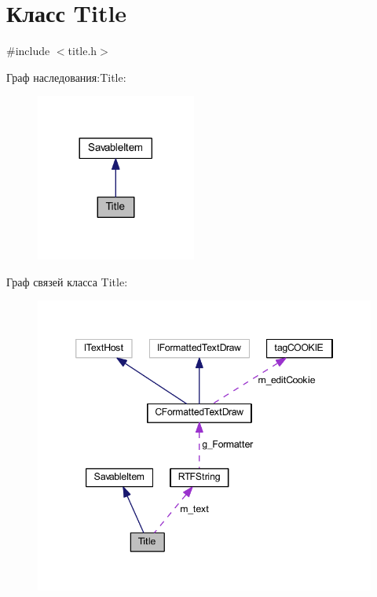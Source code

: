 \hypertarget{class_title}{\section{Класс Title}
\label{class_title}
}


{\ttfamily \#include $<$title.\-h$>$}



Граф наследования\-:Title\-:
\nopagebreak
\begin{figure}[H]
\begin{center}
\leavevmode
\includegraphics[width=149pt]{class_title__inherit__graph}
\end{center}
\end{figure}


Граф связей класса Title\-:
\nopagebreak
\begin{figure}[H]
\begin{center}
\leavevmode
\includegraphics[width=346pt]{class_title__coll__graph}
\end{center}
\end{figure}
